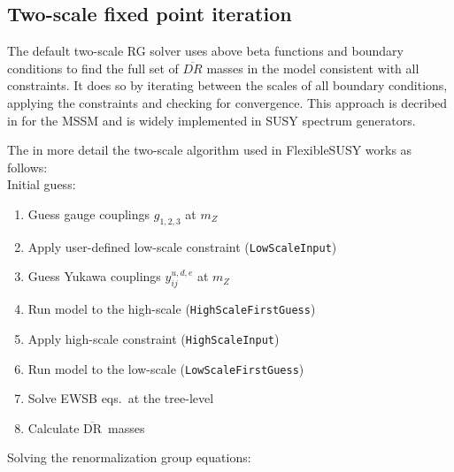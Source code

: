 \documentclass[final,3p,times,pdflatex]{elsarticle}
\newcommand{\fs}{FlexibleSUSY\xspace}
\newcommand{\code}[1]{\lstinline|#1|}  %
\newcommand{\textoverline}[1]{$\overline{\mbox{#1}}$}
\newcommand{\DRbar}{\textoverline{DR}\xspace}
\begin{document}
\subsection{Two-scale fixed point iteration}
The default two-scale RG solver uses above beta functions and boundary
conditions to find the full set of $\overline{DR}$ masses in the model
consistent with all constraints.  It does so by iterating between the
scales of all boundary conditions, applying the constraints and
checking for convergence.  This approach is decribed in
\cite{Barger:1993gh} for the MSSM and is widely implemented in SUSY
spectrum generators.

The in more detail the two-scale algorithm used in \fs works as
follows:
%
\\Initial guess:
\begin{enumerate}
\item Guess gauge couplings $g_{1,2,3}$ at $m_Z$
\item Apply user-defined low-scale constraint (\code{LowScaleInput})
\item Guess Yukawa couplings $y^{u,d,e}_{ij}$ at $m_Z$
\item Run model to the high-scale (\code{HighScaleFirstGuess})
\item Apply high-scale constraint (\code{HighScaleInput})
\item Run model to the low-scale (\code{LowScaleFirstGuess})
\item Solve EWSB eqs.\ at the tree-level
\item Calculate \DRbar\ masses
\end{enumerate}
%
Solving the renormalization group equations:
\end{document}
